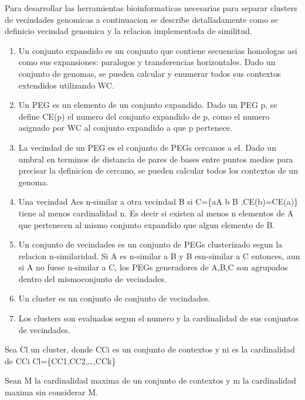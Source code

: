 \documentclass[12pt,twoside]{reedthesis}
\begin{document}
  Para desarrollar las herramientas bioinformaticas necesarias para
  separar clusters de vecindades genomicas a continuacion se describe
  detalladamente como se definicio vecindad genomica y la relacion
  implementada de similitud.
  
  \begin{enumerate}
  \def\labelenumi{\arabic{enumi}.}
  \item
    Un conjunto expandido es un conjunto que contiene secuencias homologas
    asi como sus expansiones: paralogos y transferencias horizontales.
    Dado un conjunto de genomas, se pueden calcular y enumerar todos sus
    contextos extendidos utilizando WC.
  \item
    Un PEG es un elemento de un conjunto expandido. Dado un PEG p, se
    define CE(p) el numero del conjunto expandido de p, como el numero
    asignado por WC al conjunto expandido a que p pertenece.
  \item
    La vecindad de un PEG es el conjunto de PEGs cercanos a el. Dado un
    umbral en terminos de distancia de pares de bases entre puntos medios
    para precisar la definicion de cercano, se pueden calcular todos los
    contextos de un genoma.
  \item
    Una vecindad Aes n-similar a otra vecindad B si C=\{aA \textbar{} b B
    ,CE(b)=CE(a)\} tiene al menos cardinalidad n. Es decir si existen al
    menos n elementos de A que pertenecen al mismo conjunto expandido que
    algun elemento de B.
  \item
    Un conjunto de vecindades es un conjunto de PEGs clusterizado segun la
    relacion n-similaridad. Si A es n-similar a B y B esn-similar a C
    entonces, aun si A no fuese n-similar a C, los PEGs generadores de
    A,B,C son agrupados dentro del mismoconjunto de vecindades.
  \item
    Un cluster es un conjunto de conjunto de vecindades.
  \item
    Los clusters son evaluados segun el numero y la cardinalidad de sus
    conjuntos de vecindades.
  \end{enumerate}
  
  Sea Cl un cluster, donde CCi es un conjunto de contextos y ni es la
  cardinalidad de CCi Cl=\{CC1,CC2,\ldots{},CCk\}
  
  Sean M la cardinalidad maxima de un conjunto de contextos y m la
  cardinalidad maxima sin considerar M.
  
  \begin{Shaded}
  \begin{Highlighting}[]
  \end{Highlighting}
  \end{Shaded}
  
\end{document}
